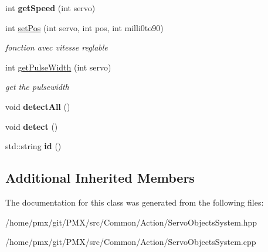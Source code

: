 \begin{DoxyCompactItemize}
\mbox{\label{classServoObjectsSystem_af9900bc699365da539559e7c630f70f2}} 
int {\bfseries get\+Speed} (int servo)
\item 
\mbox{\label{classServoObjectsSystem_ab4084aed07125c20da10192c5a226d54}} 
int \hyperlink{classServoObjectsSystem_ab4084aed07125c20da10192c5a226d54}{set\+Pos} (int servo, int pos, int milli0to90)
\begin{DoxyCompactList}\small\item\em fonction avec vitesse reglable \end{DoxyCompactList}\item 
\mbox{\label{classServoObjectsSystem_aa422c0eb68a5f29a9db34f3225bdea2a}} 
int \hyperlink{classServoObjectsSystem_aa422c0eb68a5f29a9db34f3225bdea2a}{get\+Pulse\+Width} (int servo)
\begin{DoxyCompactList}\small\item\em get the pulsewidth \end{DoxyCompactList}\item 
\mbox{\label{classServoObjectsSystem_a24493ce2c4405cc4df41aa036de09262}} 
void {\bfseries detect\+All} ()
\item 
\mbox{\label{classServoObjectsSystem_ab56910319decab536a3ebdd2d6ba91e5}} 
void {\bfseries detect} ()
\item 
\mbox{\label{classServoObjectsSystem_ab1796e791e2b2b7b2195aa3ddb76c769}} 
std\+::string {\bfseries id} ()
\end{DoxyCompactItemize}
\subsection*{Additional Inherited Members}


The documentation for this class was generated from the following files\+:\begin{DoxyCompactItemize}
\item 
/home/pmx/git/\+P\+M\+X/src/\+Common/\+Action/Servo\+Objects\+System.\+hpp\item 
/home/pmx/git/\+P\+M\+X/src/\+Common/\+Action/Servo\+Objects\+System.\+cpp\end{DoxyCompactItemize}
